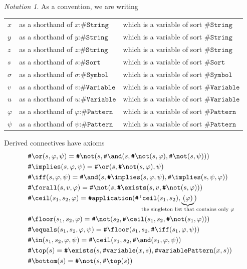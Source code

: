 \documentclass[UTF8,11pt]{article}
\newcounter{thmcounter}
\theoremstyle{plain}
\theoremstyle{definition}
\theoremstyle{remark}
\newtheorem{notation}   [thmcounter]{Notation}
\newcommand{\cln}{\texttt{:}}
\newcommand{\sharpsymbol}{\#}
\newcommand{\KString}{\texttt{\sharpsymbol String}}
\newcommand{\KSort}{\texttt{\sharpsymbol Sort}}
\newcommand{\KSymbol}{\texttt{\sharpsymbol Symbol}}
\newcommand{\KSymbolceil}{\texttt{\sharpsymbol `ceil}}
\newcommand{\KVariable}{\texttt{\sharpsymbol Variable}}
\newcommand{\KvariablePattern}{\texttt{\sharpsymbol variablePattern}}
\newcommand{\KPattern}{\texttt{\sharpsymbol Pattern}}
\newcommand{\Kvariable}{\texttt{\sharpsymbol variable}}
\newcommand{\Kand}{\texttt{\sharpsymbol  \slashsymbol and}}
\newcommand{\Kor}{\texttt{\sharpsymbol \slashsymbol  or}}
\newcommand{\Kimplies}{\texttt{\sharpsymbol  \slashsymbol implies}}
\newcommand{\Kiff}{\texttt{\sharpsymbol  \slashsymbol iff}}
\newcommand{\Knot}{\texttt{\sharpsymbol  \slashsymbol not}}
\newcommand{\Kapplication}{\texttt{\sharpsymbol application}}
\newcommand{\Kexists}{\texttt{\sharpsymbol \slashsymbol  exists}}
\newcommand{\Kforall}{\texttt{\sharpsymbol \slashsymbol  forall}}
\newcommand{\Kequals}{\texttt{\sharpsymbol \slashsymbol  equals}}
\newcommand{\Kmembership}{\Kin}
\newcommand{\Kin}{\texttt{\sharpsymbol \slashsymbol  in}}
\newcommand{\Ktop}{\texttt{\sharpsymbol \slashsymbol  top}}
\newcommand{\Kbottom}{\texttt{\sharpsymbol \slashsymbol  bottom}}
\newcommand{\Kfloor}{\texttt{\sharpsymbol \slashsymbol  floor}}
\newcommand{\Kceil}{\texttt{\sharpsymbol \slashsymbol  ceil}}
\newcommand{\slashsymbol}{\symbol{92}}
\begin{document}
\begin{notation}\label{notation:variables-about-KPattern}
	As a convention, we are writing
	\begin{center}
	\begin{tabular}{lll}
		$x$ & as a shorthand of $x \cln \KString$ 
		& which is a variable of sort $\KString$
		\\
		$y$ & as a shorthand of $y \cln \KString$ 
		& which is a variable of sort $\KString$
		\\
		$z$ & as a shorthand of $z \cln \KString$ 
		& which is a variable of sort $\KString$
		\\
		$s$ & as a shorthand of $s \cln \KSort$ 
		& which is a variable of sort $\KSort$
		\\
		$\sigma$ & as a shorthand of $\sigma \cln \KSymbol$ 
		& which is a variable of sort $\KSymbol$
		\\
		$v$ & as a shorthand of $v \cln \KVariable$ 
		& which is a variable of sort $\KVariable$
		\\
		$u$ & as a shorthand of $u \cln \KVariable$ 
		& which is a variable of sort $\KVariable$
		\\
		$\varphi$ & as a shorthand of $\varphi \cln \KPattern$ 
		& which is a variable of sort $\KPattern$
		\\
		$\psi$ & as a shorthand of $\psi \cln \KPattern$ 
		& which is a variable of sort $\KPattern$
	\end{tabular}
	\end{center} 
\end{notation}

Derived connectives have axioms
\begin{align*}
  & \Kor(s, \varphi, \psi) 
  = \Knot(s, \Kand(s, \Knot(s, \varphi), \Knot(s, \psi)))
  \\
  & \Kimplies(s, \varphi, \psi) 
  = \Kor(s, \Knot(s, \varphi), \psi)
  \\
  & \Kiff(s, \varphi, \psi) 
  = \Kand(s, \Kimplies(s, \varphi, \psi), \Kimplies(s, \psi, \varphi))
  \\
  & \Kforall(s, v, \varphi) 
  = \Knot(s, \Kexists(s, v, \Knot(s, \varphi)))
  \\
  & \Kceil(s_1, s_2, \varphi) =
    \Kapplication(\KSymbolceil(s_1, s_2),
    \underbrace{(\varphi)}_{
    	\mathclap{
    		\text{the singleton list that contains only $\varphi$}}})
  \\
  & \Kfloor(s_1, s_2, \varphi) 
  = \Knot(s_2, \Kceil(s_1, s_2, \Knot(s_1, \varphi)))
  \\
  & \Kequals(s_1, s_2, \varphi, \psi) 
  = \Kfloor(s_1, s_2, \Kiff(s_1, \varphi, \psi))
  \\
  & \Kmembership(s_1, s_2, \varphi, \psi) 
  = \Kceil(s_1, s_2, \Kand(s_1, \varphi, \psi))
  \\
  & \Ktop(s) = \Kexists(s, \Kvariable(x, s), 
    \KvariablePattern(x, s))
  \\
  & \Kbottom(s) = \Knot(s, \Ktop(s))
\end{align*}
\end{document}
